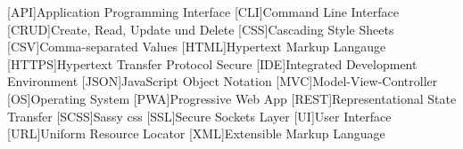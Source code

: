 \begin{acronym}[MMMMMM]
 
 	[API]{Application Programming Interface}
	[CLI]{Command Line Interface}
	[CRUD]{Create, Read, Update und Delete}
	[CSS]{Cascading Style Sheets}
	[CSV]{Comma-separated Values}
	[HTML]{Hypertext Markup Langauge}
	[HTTPS]{Hypertext Transfer Protocol Secure}
	[IDE]{Integrated Development Environment}
	[JSON]{JavaScript Object Notation}
	[MVC]{Model-View-Controller}
	[OS]{Operating System}
	[PWA]{Progressive Web App}
	[REST]{Representational State Transfer}
	[SCSS]{Sassy \acs{css}}
	[SSL]{Secure Sockets Layer}
	[UI]{User Interface}
	[URL]{Uniform Resource Locator}
	[XML]{Extensible Markup Language}

\end{acronym}
